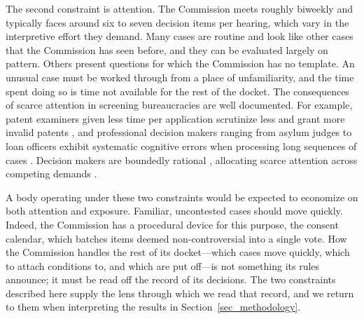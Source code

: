 The second constraint is attention. The Commission meets roughly biweekly and typically faces around six to seven decision items per hearing, which vary in the interpretive effort they demand. Many cases are routine and look like other cases that the Commission has seen before, and they can be evaluated largely on pattern. Others present questions for which the Commission has no template.
An unusual case must be worked through from a place of unfamiliarity, and the time spent doing so is time not available for the rest of the docket. The consequences of scarce attention in screening bureaucracies are well documented. For example, patent examiners given less time per application scrutinize less and grant more invalid patents \citep{frakeswasserman2017}, and professional decision makers ranging from asylum judges to loan officers exhibit systematic cognitive errors when processing long sequences of cases \citep{chenmoskowitzshue2016}. Decision makers are boundedly rational \citep{simon1955}, allocating scarce attention across competing demands \citep{mackowiaketal2023}. 

A body operating under these two constraints would be expected to economize on both attention and exposure. Familiar, uncontested cases should move quickly. Indeed, the Commission has a procedural device for this purpose, the consent calendar, which batches items deemed non-controversial into a single vote. How the Commission handles the rest of its docket---which cases move quickly, which to attach conditions to, and which are put off---is not something its rules announce; it must be read off the record of its decisions. The two constraints described here supply the lens through which we read that record, and we return to them when interpreting the results in Section~\ref{sec_methodology}. 

